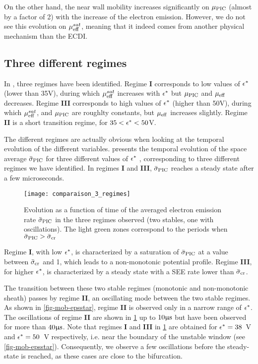  On the other hand, the near wall mobility increases significantly on $\mu_{\mathrm{PIC}}$ (almost by a factor of 2) with the increase of the electron emission.
  However, we do not see this evolution on $\mu_{\mathrm{eff}}^{sat}$, meaning that it indeed comes from another physical mechanism than the \ac{ECDI}.
  
  
  \subsection{Three different regimes}
  \label{subsec-regimes}

  In , three regimes have been identified.
  Regime {\bf I} corresponds to low values of $\epsilon^{*}$ (lower than 35V), during which $\mu_{\mathrm{eff}}^{sat}$ increases with $\epsilon^{*}$ but $\mu_{\mathrm{PIC}}$ and $\mu_{\mathrm{eff}}$ decreases.
  Regime {\bf III} corresponds to high values of $\epsilon^{*}$ (higher than 50V), during which $\mu_{\mathrm{eff}}^{sat}$, and  $\mu_{\mathrm{PIC}}$ are roughlty constants, but $\mu_{\mathrm{eff}}$ increases slightly.
  Regime {\bf II} is a short transition regime, for $35 < \epsilon^{*} < 50$V.
  
  The different regimes are actually obvious when looking at the temporal evolution of the different variables.
    presents the temporal evolution of the space average $ \bar{\sigma }_{\rm PIC}$ for three different
  values of $\epsilon^{*}$ , corresponding to three different regimes we have identified.
  In regimes {\bf I} and {\bf III}, $ \bar{\sigma }_{\rm PIC}$ reaches a steady state after a few microseconds.

  \begin{figure}[hbtp]
    \centering
    \texttt{[image: comparaison\_3\_regimes]}
    \caption{Evolution as a function of time of the averaged electron emission rate $ \bar{\sigma }_{\rm PIC}$ in the three regimes observed (two stables, one with oscillations). The light green zones correspond to the periods when $ \bar{\sigma }_{\rm PIC} >  \bar{\sigma }_{\rm cr}$}
    \label{fig-threeregimes}
  \end{figure}
  

  Regime {\bf I}, with low $\epsilon^{*}$, is characterized by a saturation of $ \bar{\sigma }_{\rm PIC}$ at a value between $ \bar{\sigma }_{\rm cr}$ and 1, which leads to a non-monotonic potential profile.
  Regime {\bf III}, for higher $\epsilon^{*}$, is characterized by a steady state with a SEE rate lower than $ \bar{\sigma }_{\rm cr}$.

  The transition between these two stable regimes (monotonic and non-monotonic sheath) passes by regime {\bf II}, an oscillating mode between the two stable regimes.
 As shown in \cref{fig-mob-epsstar}, regime {\bf II} is observed only in a narrow range of $\epsilon^{*}$.
 The oscillations of regime {\bf II} are shown in \cref{fig-threeregimes} up to $10\mathrm{\upmu s}$ but have been observed for more than $40\mathrm{\upmu s}$.
 Note that regimes {\bf I} and {\bf III} in \cref{fig-threeregimes} are obtained for $\epsilon^{*} = 38$~V and $\epsilon^{*} = 50$~V respectively, i.e. near the boundary of the unstable window (see \cref{fig-mob-epsstar}).
 Consequently, we observe a few oscillations before the steady-state is reached, as these cases are close to the bifurcation.
   
